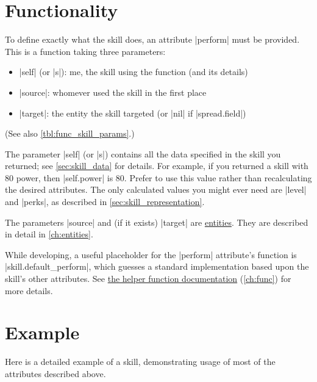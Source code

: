 \section{Functionality}
\label{sec:skill_func}

To define exactly what the skill does, an attribute |perform| must be provided.
This is a function taking three parameters:
\begin{itemize}[noitemsep]
    \item |self| (or |s|): me, the skill using the function (and its details)
    \item |source|: whomever used the skill in the first place
    \item |target|: the entity the skill targeted (or |nil| if |spread.field|)
\end{itemize}

(See also \autoref{tbl:func_skill_params}.)

The parameter |self| (or |s|) contains
all the data specified in the skill you returned;
see \autoref{sec:skill_data} for details.
For example, if you returned a skill with 80 power, then |self.power| is 80.
Prefer to use this value rather than recalculating the desired attributes.
The only calculated values you might ever need are |level| and |perks|,
as described in \autoref{sec:skill_representation}.

The parameters |source| and (if it exists) |target| are \hyperref[ch:entities]{entities}.
They are described in detail in \autoref{ch:entities}.

While developing, a useful placeholder for the |perform| attribute's function is
|skill.default_perform|, which guesses a standard implementation
based upon the skill's other attributes.
See \hyperref[ch:func]{the helper function documentation}
(\autoref{ch:func}) for more details.

\section{Example}
\label{sec:skill_example}

Here is a detailed example of a skill,
demonstrating usage of most of the attributes described above.


